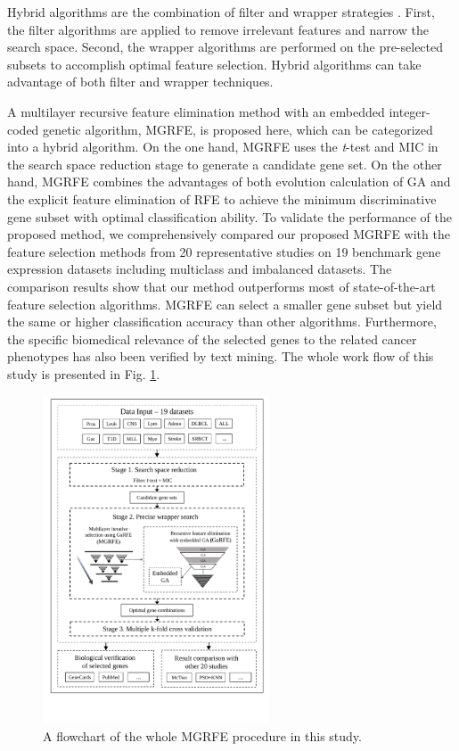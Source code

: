 \documentclass[10pt,journal,compsoc]{IEEEtran}
\begin{document}
	Hybrid algorithms are the combination of filter and wrapper strategies \cite{W6}. First, the filter algorithms are applied to remove irrelevant features and narrow the search space. Second, the wrapper algorithms are performed on the pre-selected subsets to accomplish optimal feature selection. Hybrid algorithms can take advantage of both filter and wrapper techniques.
	
	A multilayer recursive feature elimination method with an embedded integer-coded genetic algorithm, MGRFE, is proposed here, which can be categorized into a hybrid algorithm. On the one hand, MGRFE uses the \textit{t}-test and MIC in the search space reduction stage to generate a candidate gene set. On the other hand, MGRFE combines the advantages of both evolution calculation of GA and the explicit feature elimination of RFE to achieve the minimum discriminative gene subset with optimal classification ability.
	To validate the performance of the proposed method, we comprehensively compared our proposed MGRFE with the feature selection methods from 20 representative studies on 19 benchmark gene expression datasets including multiclass and imbalanced datasets. The comparison results show that our method outperforms most of state-of-the-art feature selection algorithms. MGRFE can select a smaller gene subset but yield the same or higher classification accuracy than other algorithms. Furthermore, the specific biomedical relevance of the selected genes to the related cancer phenotypes has also been verified by text mining. The whole work flow of this study is presented in Fig. \ref{Fig:MGRFE_whole}.

	
	\begin{figure}[!htbp]
		\centering
		\includegraphics[width=0.6\textwidth]{pictures/MGRFE-whole.pdf}
		\caption{A flowchart of the whole MGRFE procedure in this study.}
		\label{Fig:MGRFE_whole}
	\end{figure}
	
\end{document}
